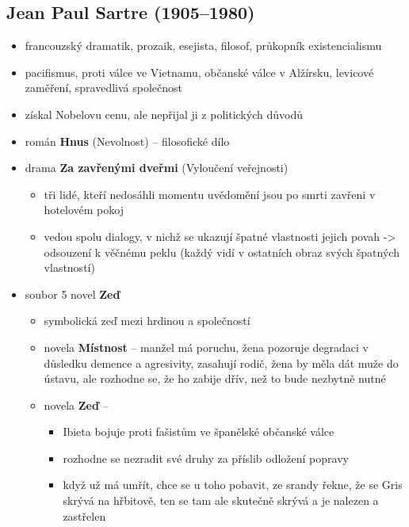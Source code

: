 \subsection{Jean Paul Sartre (1905--1980)}
\begin{itemize}
\item francouzský dramatik, prozaik, esejista, filosof, průkopník existencialismu
\item pacifismus, proti válce ve Vietnamu, občanské válce v Alžírsku, levicové zaměření, spravedlivá společnost
\item získal Nobelovu cenu, ale nepřijal ji z politických důvodů
\item román \textbf{Hnus} (Nevolnost) -- filosofické dílo
\item drama \textbf{Za zavřenými dveřmi} (Vyloučení veřejnosti)
	\begin{itemize}
	\item tři lidé, kteří nedosáhli momentu uvědomění jsou po smrti zavřeni v hotelovém pokoj
	\item vedou spolu dialogy, v nichž se ukazují špatné vlastnosti jejich povah -> odsouzení k věčnému peklu (každý vidí v ostatních obraz svých špatných vlastností)
	\end{itemize}
\item soubor 5 novel \textbf{Zeď}
	\begin{itemize}
	\item symbolická zeď mezi hrdinou a společností
	\item novela \textbf{Místnost} -- manžel má poruchu, žena pozoruje degradaci v důsledku demence a agresivity, zasahují rodič, žena by měla dát muže do ústavu, ale rozhodne se, že ho zabije dřív, než to bude nezbytně nutné
	\item novela \textbf{Zeď} -- 
		\begin{itemize}
		\item Ibieta bojuje proti fašistům ve španělské občanské válce
		\item rozhodne se nezradit své druhy za příslib odložení popravy
		\item když už má umřít, chce se u toho pobavit, ze srandy řekne, že se Gris skrývá na hřbitově, ten se tam ale skutečně skrývá a je nalezen a zastřelen
		\end{itemize}
	\end{itemize}
\end{itemize}

